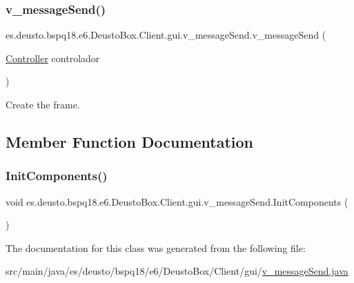 \subsubsection{\texorpdfstring{v\+\_\+message\+Send()}{v\_messageSend()}}
{\footnotesize\ttfamily es.\+deusto.\+bspq18.\+e6.\+Deusto\+Box.\+Client.\+gui.\+v\+\_\+message\+Send.\+v\+\_\+message\+Send (\begin{DoxyParamCaption}\item[{\mbox{\hyperlink{classes_1_1deusto_1_1bspq18_1_1e6_1_1_deusto_box_1_1_client_1_1controller_1_1_controller}{Controller}}}]{controlador }\end{DoxyParamCaption})}

Create the frame. 

\subsection{Member Function Documentation}
\mbox{\label{classes_1_1deusto_1_1bspq18_1_1e6_1_1_deusto_box_1_1_client_1_1gui_1_1v__message_send_a0c148f60ff6097f89a881d50a500a66b}} 
\subsubsection{\texorpdfstring{Init\+Components()}{InitComponents()}}
{\footnotesize\ttfamily void es.\+deusto.\+bspq18.\+e6.\+Deusto\+Box.\+Client.\+gui.\+v\+\_\+message\+Send.\+Init\+Components (\begin{DoxyParamCaption}{ }\end{DoxyParamCaption})}



The documentation for this class was generated from the following file\+:\begin{DoxyCompactItemize}
\item 
src/main/java/es/deusto/bspq18/e6/\+Deusto\+Box/\+Client/gui/\mbox{\hyperlink{v__message_send_8java}{v\+\_\+message\+Send.\+java}}\end{DoxyCompactItemize}
